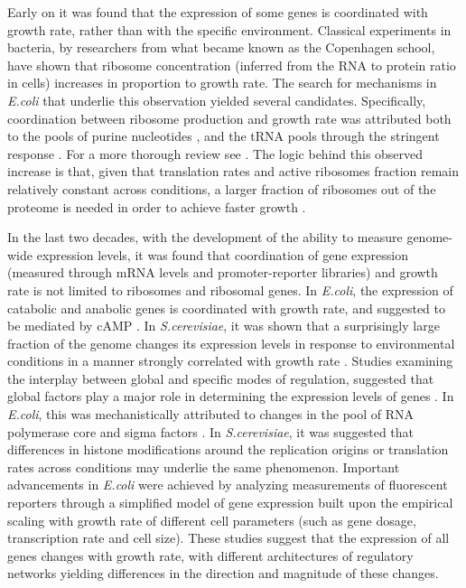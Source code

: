 \documentclass[notitlepage]{article}
\begin{document}
Early on it was found that the expression of some genes is coordinated with growth rate, rather than with the specific environment.
Classical experiments in bacteria, by researchers from what became known as the Copenhagen school, have shown that ribosome concentration (inferred from the RNA to protein ratio in cells) increases in proportion to growth rate\parencite{Schaechter1958}.
The search for mechanisms in \emph{E.coli} that underlie this observation yielded several candidates.
Specifically, coordination between ribosome production and growth rate was attributed both to the pools of purine nucleotides \parencite{Gourse1996,Gaal1997}, and the tRNA pools through the stringent response \parencite{Chatterji2001,Brauer2008a}.
For a more thorough review see \parencite{Nomura1984}.
The logic behind this observed increase is that, given that translation rates and active ribosomes fraction remain relatively constant across conditions, a larger fraction of ribosomes out of the proteome is needed in order to achieve faster growth \parencite{neidhardt1999a,dennis2004,Zaslaver2009}.

In the last two decades, with the development of the ability to measure genome-wide expression levels, it was found that coordination of gene expression (measured through mRNA levels and promoter-reporter libraries) and growth rate is not limited to ribosomes and ribosomal genes.
In \emph{E.coli}, the expression of catabolic and anabolic genes is coordinated with growth rate, and suggested to be mediated by cAMP \parencite{Saldanha2004}.
In \emph{S.cerevisiae}, it was shown that a surprisingly large fraction of the genome changes its expression levels in response to environmental conditions in a manner strongly correlated with growth rate \parencite{Keren2013a,Gasch2000,Castrillo2007,Zaslaver2009, Gerosa2013}.
Studies examining the interplay between global and specific modes of regulation, suggested that global factors play a major role in determining the expression levels of genes \parencite{Gasch2000, Klumpp2009a,Scott2010, Berthoumieux2013}.
In \emph{E.coli}, this was mechanistically attributed to changes in the pool of RNA polymerase core and sigma factors \parencite{Klumpp2008}.
In \emph{S.cerevisiae}, it was suggested that differences in histone modifications around the replication origins \parencite{regenberg2006} or translation rates \parencite{Gasch2000} across conditions may underlie the same phenomenon.
Important advancements in \emph{E.coli} were achieved by analyzing measurements of fluorescent reporters through a simplified model of gene expression built upon the empirical scaling with growth rate of different cell parameters (such as gene dosage, transcription rate and cell size)\parencite{Klumpp2009a}.
These studies suggest that the expression of all genes changes with growth rate, with different architectures of regulatory networks yielding differences in the direction and magnitude of these changes. 
\end{document}
